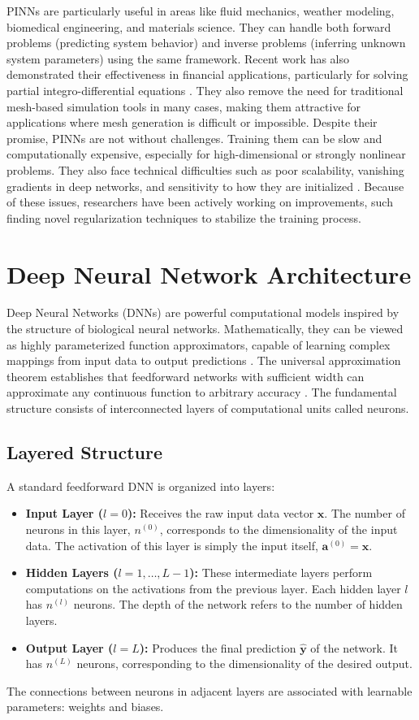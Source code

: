 \documentclass[11pt,twoside,openright]{report}
\begin{document}
PINNs are particularly useful in areas like fluid mechanics, weather modeling, biomedical engineering, and materials science. They can handle both forward problems (predicting system behavior) and inverse problems (inferring unknown system parameters) using the same framework. Recent work has also demonstrated their effectiveness in financial applications, particularly for solving partial integro-differential equations \cite{frey2022deep}. They also remove the need for traditional mesh-based simulation tools in many cases, making them attractive for applications where mesh generation is difficult or impossible.
Despite their promise, PINNs are not without challenges. Training them can be slow and computationally expensive, especially for high-dimensional or strongly nonlinear problems. They also face technical difficulties such as poor scalability, vanishing gradients in deep networks, and sensitivity to how they are initialized \cite{beck2021solving}. Because of these issues, researchers have been actively working on improvements, such finding novel regularization techniques to stabilize the training process.

\section{Deep Neural Network Architecture}

Deep Neural Networks (DNNs) are powerful computational models inspired by the structure of biological neural networks. Mathematically, they can be viewed as highly parameterized function approximators, capable of learning complex mappings from input data to output predictions \cite{goodfellow2016deep}. The universal approximation theorem establishes that feedforward networks with sufficient width can approximate any continuous function to arbitrary accuracy \cite{hornik1989multilayer}. The fundamental structure consists of interconnected layers of computational units called neurons.

\subsection{Layered Structure}
A standard feedforward DNN is organized into layers:
\begin{itemize}
    \item \textbf{Input Layer ($l=0$):} Receives the raw input data vector $\mathbf{x}$. The number of neurons in this layer, $n^{(0)}$, corresponds to the dimensionality of the input data. The activation of this layer is simply the input itself, $\mathbf{a}^{(0)} = \mathbf{x}$.
    \item \textbf{Hidden Layers ($l=1, \dots, L-1$):} These intermediate layers perform computations on the activations from the previous layer. Each hidden layer $l$ has $n^{(l)}$ neurons. The depth of the network refers to the number of hidden layers.
    \item \textbf{Output Layer ($l=L$):} Produces the final prediction $\hat{\mathbf{y}}$ of the network. It has $n^{(L)}$ neurons, corresponding to the dimensionality of the desired output.
\end{itemize}
The connections between neurons in adjacent layers are associated with learnable parameters: weights and biases.
\end{document}
